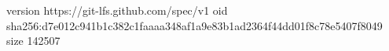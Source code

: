 version https://git-lfs.github.com/spec/v1
oid sha256:d7e012c941b1c382c1faaaa348af1a9e83b1ad2364f44dd01f8c78e5407f8049
size 142507
